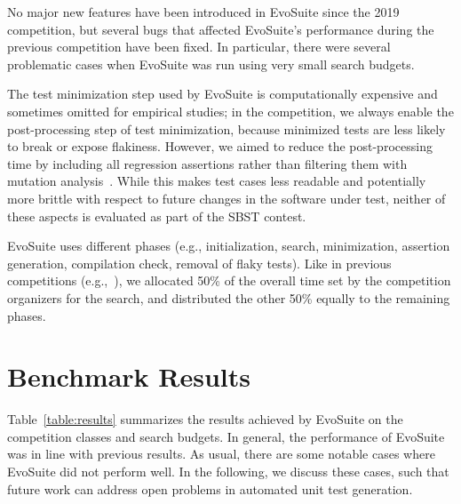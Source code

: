 \documentclass[sigconf]{acmart}
\newcommand{\EVOSUITE}{{\sc EvoSuite}\xspace}
\begin{document}
No major new features have been introduced in \EVOSUITE since the 2019 competition, but several bugs that affected \EVOSUITE's performance during the previous competition have been fixed. In particular, there were several problematic cases when \EVOSUITE was run using very small search budgets.

The test minimization step used by \EVOSUITE is computationally expensive and
sometimes omitted for empirical studies; in the competition, we always enable
the post-processing step of test minimization, because minimized tests are less
likely to break or expose flakiness. However, we aimed to reduce the
post-processing time by including all regression assertions rather than
filtering them with mutation analysis~\cite{10.1109/TSE.2011.93}. While this
makes test cases less readable and potentially more brittle with respect to
future changes in the software under test, neither of these aspects is
evaluated as part of the SBST contest.

\EVOSUITE uses different phases (e.g., initialization, search, minimization,
assertion generation, compilation check, removal of flaky tests). Like in
previous competitions (e.g.,~\cite{evosuiteAtSbst2016}), we allocated 50\% of
the overall time set by the competition organizers for the search, and
distributed the other 50\% equally to the remaining phases.



\section{Benchmark Results}


\begin{table*}[t!]
  \centering
  \caption{\label{table:results}Detailed results of \EVOSUITE on the
    SBST benchmark classes.}
\resizebox{0.9\textwidth}{!}{  

}	
\end{table*}

Table~\ref{table:results} summarizes the results achieved by \EVOSUITE on the competition classes and search budgets. In general, the performance of \EVOSUITE was in line with previous
results. As usual, there are some notable cases where \EVOSUITE did not perform well. In the following, we discuss these cases, such that future work can address open problems in automated unit test generation.


\end{document}
